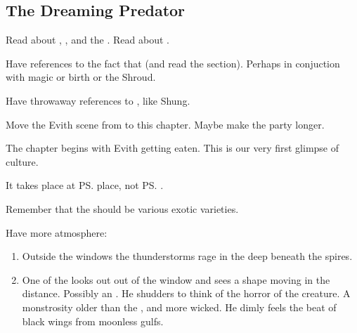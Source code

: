 \subsection{The Dreaming Predator}
\begin{changes}
  \begin{comment}\paragraph{Wanderer in Darkness}\end{comment}
    
    Read about , ,  and the .
    Read about . 
    
    Have references to the fact that  (and read the section). 
    Perhaps in conjuction with magic or birth or the Shroud. 
    
    Have throwaway references to , like Shung. 
  
    Move the Evith scene from  to this chapter. 
    Maybe make the party longer. 
    
    The chapter begins with Evith getting eaten.
    This is our very first glimpse of \resphan culture.
    
    It takes place at \ps{\Teshrial} place, not \ps{\Ganethed}. 
    
    Remember that the \humans should be various exotic \demihuman varieties.
    
    Have more atmosphere: 
    \begin{enumerate}
      \item 
        Outside the windows the thunderstorms rage in the deep beneath the spires. 
      \item 
        One of the \resphain looks out out of the window and sees a shape moving in the distance. 
        Possibly an \umbra. 
        He shudders to think of the horror of the creature. 
        A monstrosity older than the \resphain, and more wicked. 
        He dimly feels the beat of black wings from moonless gulfs. 
        

\end{enumerate}
\end{changes}
